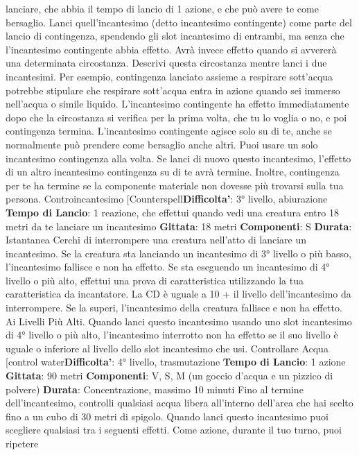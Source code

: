 \begin{multicols}{2}
lanciare, che abbia il tempo di lancio di 1 azione, e che
può avere te come bersaglio. Lanci quell’incantesimo
(detto incantesimo contingente) come parte del lancio di
contingenza, spendendo gli slot incantesimo di
entrambi, ma senza che l’incantesimo contingente
abbia effetto. Avrà invece effetto quando si avvererà
una determinata circostanza. Descrivi questa
circostanza mentre lanci i due incantesimi. Per
esempio, contingenza lanciato assieme a respirare
sott’acqua potrebbe stipulare che respirare sott’acqua
entra in azione quando sei immerso nell’acqua o simile
liquido.
L’incantesimo contingente ha effetto immediatamente
dopo che la circostanza si verifica per la prima volta,
che tu lo voglia o no, e poi contingenza termina.
L’incantesimo contingente agisce solo su di te, anche
se normalmente può prendere come bersaglio anche
altri. Puoi usare un solo incantesimo contingenza alla
volta. Se lanci di nuovo questo incantesimo, l’effetto di
un altro incantesimo contingenza su di te avrà termine.
Inoltre, contingenza per te ha termine se la componente
materiale non dovesse più trovarsi sulla tua persona.
Controincantesimo
[Counterspell\textbf{Difficolta'}:
3° livello, abiurazione
\textbf{Tempo di Lancio}: 1 reazione, che effettui quando vedi
una creatura entro 18 metri da te lanciare un
incantesimo
\textbf{Gittata}: 18 metri
\textbf{Componenti}: S
\textbf{Durata}: Istantanea
Cerchi di interrompere una creatura nell’atto di lanciare
un incantesimo. Se la creatura sta lanciando un
incantesimo di 3° livello o più basso, l’incantesimo
fallisce e non ha effetto. Se sta eseguendo un
incantesimo di 4° livello o più alto, effettui una prova di
caratteristica utilizzando la tua caratteristica da
incantatore. La CD è uguale a 10 + il livello
dell’incantesimo da interrompere. Se la superi,
l’incantesimo della creatura fallisce e non ha effetto.
Ai Livelli Più Alti. Quando lanci questo incantesimo
usando uno slot incantesimo di 4° livello o più alto,
l’incantesimo interrotto non ha effetto se il suo livello è
uguale o inferiore al livello dello slot incantesimo che
usi.
Controllare Acqua
[control water\textbf{Difficolta'}:
4° livello, trasmutazione
\textbf{Tempo di Lancio}: 1 azione
\textbf{Gittata}: 90 metri
\textbf{Componenti}: V, S, M (un goccio d’acqua e un pizzico
di polvere)
\textbf{Durata}: Concentrazione, massimo 10 minuti
Fino al termine dell’incantesimo, controlli qualsiasi
acqua libera all’interno dell’area che hai scelto fino a un
cubo di 30 metri di spigolo. Quando lanci questo
incantesimo puoi scegliere qualsiasi tra i seguenti
effetti. Come azione, durante il tuo turno, puoi ripetere

\end{multicols}
